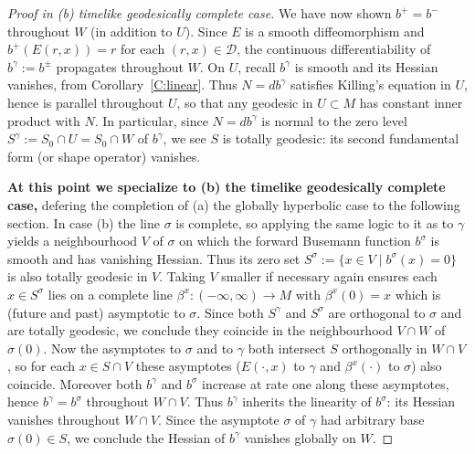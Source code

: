 \documentclass[12pt]{amsart}
\begin{document}
\begin{proof}[Proof in {(b) timelike geodesically complete} case]
We have now shown $b^+=b^-$ throughout $W$ (in addition to $U$).
Since $E$ is a smooth diffeomorphism and $b^+(E(r,x))=r$ for each $(r,x)\in \mathcal{D}$,  the continuous differentiability of $b^\gamma:=b^\pm$ 
propagates throughout $W$. On $U$,  recall $b^\gamma$
is smooth and its Hessian vanishes, from Corollary~\ref{C:linear}.
Thus $N=db^\gamma$ satisfies Killing's equation in $U$,  hence is parallel throughout $U$, so that any geodesic in $U \subset M$ has constant inner product with $N$.
In particular, since $N=db^\gamma$ is normal
to the zero level $S^\gamma := S_0\cap U =S_0\cap W$ of $b^\gamma$,
we see $S$ is totally geodesic: its second fundamental form (or shape operator) vanishes. 

%
{\bf At this point we specialize to {(b) the timelike geodesically complete} case,}
defering the completion of {(a) the globally hyperbolic} case to the following section.
In case (b) the line $\sigma$ is complete,
so applying the same logic to it as to $\gamma$
yields a neighbourhood $V$ of $\sigma$ on which the forward Busemann function
$b^\sigma$ is smooth and has vanishing Hessian.  Thus its zero set $S^\sigma := \{x\in V \mid b^\sigma(x)=0 \}$ is also totally geodesic in $V$.
Taking $V$ smaller if necessary again ensures each $x \in S^\sigma$ lies on a 
complete line $\beta^x:(-\infty,\infty) \longrightarrow M$ 
with $\beta^x(0)=x$
which is (future and past) asymptotic to $\sigma$.
Since both $S^\gamma$ and $S^\sigma$ are orthogonal to $\sigma$ and are totally geodesic,  we conclude they coincide in the 
neighbourhood $V \cap W$ of $\sigma(0)$.  Now the asymptotes to $\sigma$
and to $\gamma$ both intersect $S$ orthogonally in $W \cap V$, so for each
$x \in S\cap V$ these asymptotes ($E(\cdot,x)$ to $\gamma$ and $\beta^x(\cdot)$ to $\sigma$) also coincide.  Moreover both $b^\gamma$ and $b^\sigma$ increase at rate one along these asymptotes,  hence $b^\gamma=b^\sigma$ throughout $W\cap V$.  Thus $b^\gamma$ inherits the linearity of $b^\sigma$: its Hessian
vanishes throughout $W \cap V$.  Since the asymptote $\sigma$ of $\gamma$ had arbitrary base $\sigma(0) \in S$,  we conclude the Hessian of $b^\gamma$ vanishes globally on $W$.







\end{proof}
\end{document}
